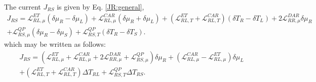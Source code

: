 The current $J_{RS}$ is given by Eq. \eqref{JR:general},
\begin{multline*}
J_{RS}=
\mathcal{L}_{RL,\mu}^{ET}(\delta\mu_{R}-\delta\mu_{L})+
\mathcal{L}_{RL,\mu}^{CAR}\left(\delta\mu_{R}+\delta\mu_{L}\right)
+
(\mathcal{L}_{RL,T}^{ET}+\mathcal{L}_{RL,T}^{CAR})(\delta T_{R}-\delta T_{L})
+
2\mathcal{L}_{RR,\mu}^{DAR}\delta\mu_{R}
\\+
\mathcal{L}^{QP}_{RS,\mu}(\delta\mu_{R}-\delta\mu_{S})
+
\mathcal{L}^{QP}_{RS,T}(\delta T_{R}-\delta T_{S}).
\end{multline*}
which may be written as follows:
\begin{multline*}
J_{RS}=
(\mathcal{L}_{RL,\mu}^{ET}+\mathcal{L}_{RL,\mu}^{CAR}+2\mathcal{L}_{RR,\mu}^{DAR}+\mathcal{L}^{QP}_{RS,\mu})\delta\mu_{R}
+
(\mathcal{L}_{RL,\mu}^{CAR}-\mathcal{L}_{RL,\mu}^{ET})\delta\mu_{L}
\\+
(\mathcal{L}_{RL,T}^{ET}+\mathcal{L}_{RL,T}^{CAR})\Delta T_{RL}
+
\mathcal{L}^{QP}_{RS,T}\Delta T_{RS}.
\end{multline*}

